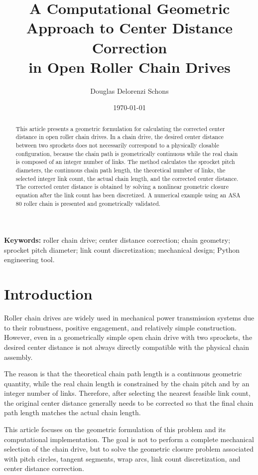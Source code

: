 \documentclass[11pt,a4paper]{article}
\title{A Computational Geometric Approach to Center Distance Correction\\
       in Open Roller Chain Drives}
\author{Douglas Delorenzi Schons}
\date{\today}
\begin{document}
\maketitle

\begin{abstract}
This article presents a geometric formulation for calculating the corrected center distance in open roller chain drives. In a chain drive, the desired center distance between two sprockets does not necessarily correspond to a physically closable configuration, because the chain path is geometrically continuous while the real chain is composed of an integer number of links. The method calculates the sprocket pitch diameters, the continuous chain path length, the theoretical number of links, the selected integer link count, the actual chain length, and the corrected center distance. The corrected center distance is obtained by solving a nonlinear geometric closure equation after the link count has been discretized. A numerical example using an ASA 80 roller chain is presented and geometrically validated.
\end{abstract}

\noindent\textbf{Keywords:} roller chain drive; center distance correction; chain geometry; sprocket pitch diameter; link count discretization; mechanical design; Python engineering tool.

\section{Introduction}

Roller chain drives are widely used in mechanical power transmission systems due to their robustness, positive engagement, and relatively simple construction. However, even in a geometrically simple open chain drive with two sprockets, the desired center distance is not always directly compatible with the physical chain assembly.

The reason is that the theoretical chain path length is a continuous geometric quantity, while the real chain length is constrained by the chain pitch and by an integer number of links. Therefore, after selecting the nearest feasible link count, the original center distance generally needs to be corrected so that the final chain path length matches the actual chain length.

This article focuses on the geometric formulation of this problem and its computational implementation. The goal is not to perform a complete mechanical selection of the chain drive, but to solve the geometric closure problem associated with pitch circles, tangent segments, wrap arcs, link count discretization, and center distance correction.
\end{document}
